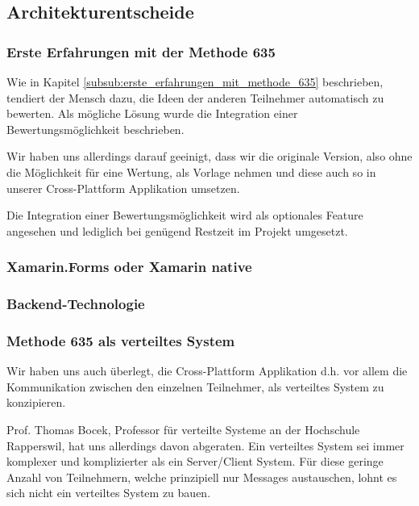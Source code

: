 \subsection{Architekturentscheide}

\subsubsection{Erste Erfahrungen mit der Methode 635}
Wie in Kapitel \ref{subsub:erste_erfahrungen_mit_methode_635} beschrieben, tendiert der Mensch dazu, die Ideen der anderen Teilnehmer automatisch zu bewerten. Als mögliche Lösung wurde die Integration einer Bewertungsmöglichkeit beschrieben.


Wir haben uns allerdings darauf geeinigt, dass wir die originale Version, also ohne die Möglichkeit für eine Wertung, als Vorlage nehmen und diese auch so in unserer Cross-Plattform Applikation umsetzen. 


Die Integration einer Bewertungsmöglichkeit wird als optionales Feature angesehen und lediglich bei genügend Restzeit im Projekt umgesetzt.

\subsubsection{Xamarin.Forms oder Xamarin native}

\subsubsection{Backend-Technologie}

\subsubsection{Methode 635 als verteiltes System}
Wir haben uns auch überlegt, die Cross-Plattform Applikation d.h. vor allem die Kommunikation zwischen den einzelnen Teilnehmer, als verteiltes System zu konzipieren.


Prof. Thomas Bocek, Professor für verteilte Systeme an der Hochschule Rapperswil, hat uns allerdings davon abgeraten. Ein verteiltes System sei immer komplexer und komplizierter als ein Server/Client System. Für diese geringe Anzahl von Teilnehmern, welche prinzipiell nur Messages austauschen, lohnt es sich nicht ein verteiltes System zu bauen. 


